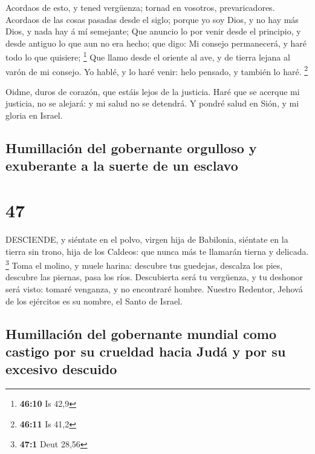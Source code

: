  Acordaos de esto, y tened vergüenza; tornad en vosotros,
prevaricadores.  Acordaos de las cosas pasadas desde el
siglo; porque yo soy Dios, y no hay más Dios, y nada hay á mí semejante;
 Que anuncio lo por venir desde el principio, y desde
antiguo lo que aun no era hecho; que digo: Mi consejo permanecerá, y
haré todo lo que quisiere; \footnote{\textbf{46:10} Is 42,9}
 Que llamo desde el oriente al ave, y de tierra lejana al
varón de mi consejo. Yo hablé, y lo haré venir: helo pensado, y también
lo haré. \footnote{\textbf{46:11} Is 41,2}

 Oidme, duros de corazón, que estáis lejos de la justicia.
 Haré que se acerque mi justicia, no se alejará: y mi salud
no se detendrá. Y pondré salud en Sión, y mi gloria en Israel.

\hypertarget{humillaciuxf3n-del-gobernante-orgulloso-y-exuberante-a-la-suerte-de-un-esclavo}{%
\subsection{Humillación del gobernante orgulloso y exuberante a la
suerte de un
esclavo}\label{humillaciuxf3n-del-gobernante-orgulloso-y-exuberante-a-la-suerte-de-un-esclavo}}

\hypertarget{section-46}{%
\section{47}\label{section-46}}

 DESCIENDE, y siéntate en el polvo, virgen hija de
Babilonia, siéntate en la tierra sin trono, hija de los Caldeos: que
nunca más te llamarán tierna y delicada. \footnote{\textbf{47:1} Deut
  28,56}  Toma el molino, y muele harina: descubre tus
guedejas, descalza los pies, descubre las piernas, pasa los ríos.
 Descubierta será tu vergüenza, y tu deshonor será visto:
tomaré venganza, y no encontraré hombre.  Nuestro Redentor,
Jehová de los ejércitos es su nombre, el Santo de Israel.

\hypertarget{humillaciuxf3n-del-gobernante-mundial-como-castigo-por-su-crueldad-hacia-juduxe1-y-por-su-excesivo-descuido}{%
\subsection{Humillación del gobernante mundial como castigo por su
crueldad hacia Judá y por su excesivo
descuido}\label{humillaciuxf3n-del-gobernante-mundial-como-castigo-por-su-crueldad-hacia-juduxe1-y-por-su-excesivo-descuido}}

